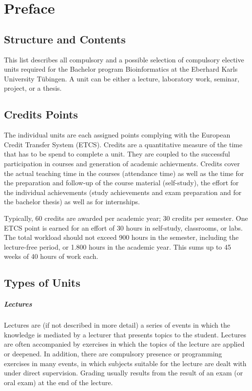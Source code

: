 \chapter*{Preface}

\section*{Structure and Contents}

This list describes all compulsory and a possible selection of compulsory elective units required for the Bachelor program Bioinformatics at the Eberhard Karls University Tübingen.
A unit can be either a lecture, laboratory work, seminar, project, or a thesis.

\section*{Credits Points}

The individual units are each assigned points complying with the European Credit Transfer System (ETCS). Credits are a quantitative measure of the time that has to be spend to complete a unit. 
They are coupled to the successful participation in courses and generation of academic achievments.
Credits cover the actual teaching time in the courses (attendance time) as well as the time for the preparation and follow-up of the course material (self-study), the effort for the individual achievements (study achievements and exam preparation and for the bachelor thesis) as well as for internships.
 
Typically, 60 credits are awarded per academic year; 30 credits per semester. 
One ETCS point is earned for an effort of 30 hours in self-study, classrooms, or labs.
The total workload should not exceed 900 hours in the semester, including the lecture-free period, or 1.800 hours in the academic year.
This sums up to 45 weeks of 40 hours of work each.

\section*{Types of Units}

\paragraph{Lectures} Lectures are (if not described in more detail) a series of events in which the knowledge is mediated by a lecturer that presents topics to the student. Lectures are often accompanied by exercises in which the topics of the lecture are applied or deepened. 
In addition, there are compulsory presence or programming exercises in many events, in which subjects suitable for the lecture are dealt with under direct supervision.
Grading usually results from the result of an exam (or oral exam) at the end of the lecture.


